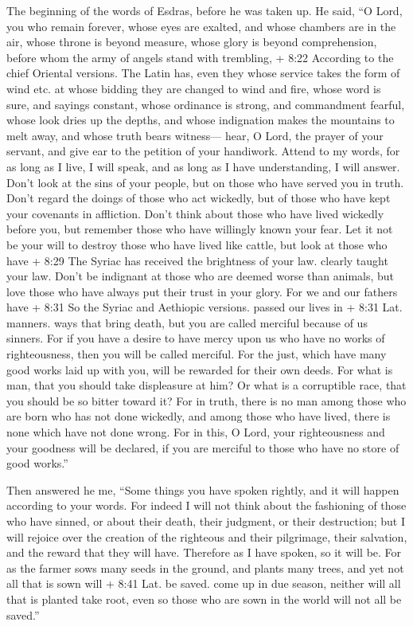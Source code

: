 The beginning of the words of Esdras, before he was taken up. He said,
 ``O Lord, you who remain forever, whose eyes are exalted,
and whose chambers are in the air,  whose throne is beyond
measure, whose glory is beyond comprehension, before whom the army of
angels stand with trembling,  + 8:22 According to the chief
Oriental versions. The Latin has, even they whose service takes the form
of wind etc. at whose bidding they are changed to wind and fire, whose
word is sure, and sayings constant, whose ordinance is strong, and
commandment fearful,  whose look dries up the depths, and
whose indignation makes the mountains to melt away, and whose truth
bears witness---  hear, O Lord, the prayer of your servant,
and give ear to the petition of your handiwork.  Attend to
my words, for as long as I live, I will speak, and as long as I have
understanding, I will answer.  Don't look at the sins of
your people, but on those who have served you in truth. 
Don't regard the doings of those who act wickedly, but of those who have
kept your covenants in affliction.  Don't think about those
who have lived wickedly before you, but remember those who have
willingly known your fear.  Let it not be your will to
destroy those who have lived like cattle, but look at those who have +
8:29 The Syriac has received the brightness of your law. clearly taught
your law.  Don't be indignant at those who are deemed worse
than animals, but love those who have always put their trust in your
glory.  For we and our fathers have + 8:31 So the Syriac
and Aethiopic versions. passed our lives in + 8:31 Lat. manners. ways
that bring death, but you are called merciful because of us sinners.
 For if you have a desire to have mercy upon us who have no
works of righteousness, then you will be called merciful. 
For the just, which have many good works laid up with you, will be
rewarded for their own deeds.  For what is man, that you
should take displeasure at him? Or what is a corruptible race, that you
should be so bitter toward it?  For in truth, there is no
man among those who are born who has not done wickedly, and among those
who have lived, there is none which have not done wrong. 
For in this, O Lord, your righteousness and your goodness will be
declared, if you are merciful to those who have no store of good
works.''

 Then answered he me, ``Some things you have spoken
rightly, and it will happen according to your words.  For
indeed I will not think about the fashioning of those who have sinned,
or about their death, their judgment, or their destruction;
 but I will rejoice over the creation of the righteous and
their pilgrimage, their salvation, and the reward that they will have.
 Therefore as I have spoken, so it will be. 
For as the farmer sows many seeds in the ground, and plants many trees,
and yet not all that is sown will + 8:41 Lat. be saved. come up in due
season, neither will all that is planted take root, even so those who
are sown in the world will not all be saved.''


